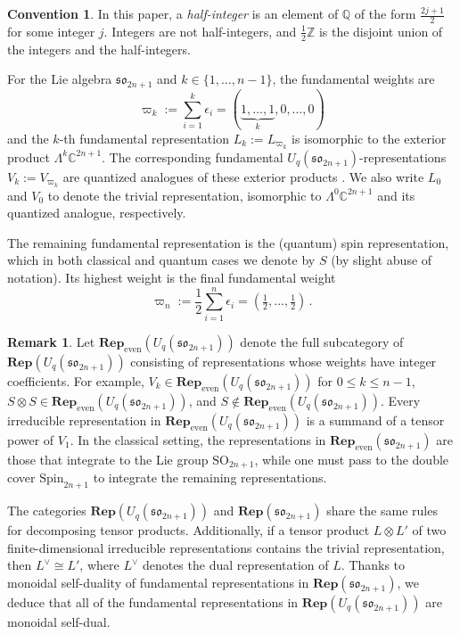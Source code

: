 \documentclass[10pt]{amsart}
\numberwithin{equation}{section}
\theoremstyle{definition}
\newtheorem{rem}[thm]{Remark}
\newtheorem{conv}[thm]{Convention}
\def\C{{\mathbb C}}
\def\Z{{\mathbb Z}}
\newcommand{\son}[1][2n+1]{\mathfrak{so}_{#1}}
\newcommand{\Rep}{\mathbf{Rep}}
\begin{document}
\begin{conv} \label{convention:halfinteger} 
In this paper, a \emph{half-integer} is an element of $\mathbb{Q}$ of the form $\frac{2j+1}{2}$ for some integer $j$. 
Integers are not half-integers, 
and $\tfrac{1}{2} \Z$ is the disjoint union of the integers and the half-integers. \end{conv}

For the Lie algebra $\son$ and $k \in \{1,\ldots,n-1\}$, 
the fundamental weights are 
\[
\varpi_k := \sum_{i=1}^k \epsilon_i = (\underbrace{1,\ldots,1}_{k},0,\ldots,0)
	\]
and the $k$-th fundamental representation $L_k :=L_{\varpi_k}$ 
is isomorphic to the exterior product $\Lambda^k \C^{2n+1}$. 
The corresponding fundamental $U_q(\son)$-representations $V_k := V_{\varpi_k}$ 
are quantized analogues of these exterior products \cite{BerZwick, BodWu}. 
We also write $L_0$ and $V_0$ to denote the trivial representation, 
isomorphic to $\Lambda^0 \C^{2n+1}$ and its quantized analogue, respectively.

The remaining fundamental representation is the (quantum) spin representation,
which in both classical and quantum cases we denote by $S$ (by slight abuse of notation).
Its highest weight is the final fundamental weight
\[
\varpi_{n} := \frac{1}{2} \sum_{i=1}^n \epsilon_i = (\tfrac{1}{2},\ldots,\tfrac{1}{2}) \, .
\]

\begin{rem}
Let $\Rep_{\text{even}}(U_q(\son))$ denote the full subcategory of $\Rep(U_q(\son))$ 
consisting of representations whose weights have integer coefficients.
For example, $V_k\in \Rep_{\text{even}}(U_q(\son))$ for $0 \le k \le n-1$, 
$S \otimes S \in \Rep_{\text{even}}(U_q(\son))$, 
and $S \notin \Rep_{\text{even}}(U_q(\son))$.
Every irreducible representation in $\Rep_{\text{even}}(U_q(\son))$ is a summand 
of a tensor power of $V_1$.
In the classical setting, the representations in $\Rep_{\text{even}}(\son)$ 
are those that integrate to the Lie group $\mathrm{SO}_{2n+1}$, 
while one must pass to the double cover 
$\mathrm{Spin}_{2n+1}$ to integrate the remaining representations.
\end{rem}

The categories $\Rep(U_q(\son))$ and $\Rep(\son)$ share the same rules for decomposing tensor products. 
Additionally, if a tensor product $L \otimes L'$ of two finite-dimensional irreducible representations 
contains the trivial representation, then $L^\vee \cong L'$, 
where $L^\vee$ denotes the dual representation of $L$.
Thanks to monoidal self-duality of fundamental representations in $\Rep(\son)$, 
we deduce that all of the fundamental representations in $\Rep(U_q(\son))$ are monoidal self-dual.
\end{document}
